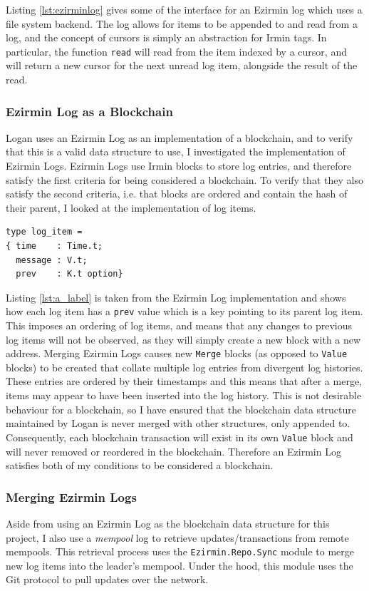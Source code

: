 \documentclass[12pt,a4paper,twoside,openright]{report}
\begin{document}
	Listing \ref{lst:ezirminlog} gives some of the interface for an Ezirmin log which uses a file system backend.
	The log allows for items to be appended to and read from a log, and the concept of cursors is simply an abstraction for Irmin tags.
	In particular, the function \texttt{read} will read from the item indexed by a cursor, and will return a new cursor for the next unread log item, alongside the result of the read.

	\subsubsection*{Ezirmin Log as a Blockchain}
	Logan uses an Ezirmin Log as an implementation of a blockchain, and to verify that this is a valid data structure to use, I investigated the implementation of Ezirmin Logs.
	Ezirmin Logs use Irmin blocks to store log entries, and therefore satisfy the first criteria for being considered a blockchain. 
	To verify that they also satisfy the second criteria, i.e. that blocks are ordered and contain the hash of their parent, I looked at the implementation of log items.

	\begin{lstlisting}[caption={Ezirmin Log Item},label={lst:a_label}]
type log_item =
{ time    : Time.t;
  message : V.t;
  prev    : K.t option}
	\end{lstlisting}

	Listing \ref{lst:a_label} is taken from the Ezirmin Log implementation and shows how each log item has a \texttt{prev} value which is a key pointing to its parent log item. 
	This imposes an ordering of log items, and means that any changes to previous log items will not be observed, as they will simply create a new block with a new address. 
	Merging Ezirmin Logs causes new \texttt{Merge} blocks (as opposed to \texttt{Value} blocks) to be created that collate multiple log entries from divergent log histories.
	These entries are ordered by their timestamps and this means that after a merge, items may appear to have been inserted into the log history.
	This is not desirable behaviour for a blockchain, so I have ensured that the blockchain data structure maintained by Logan is never merged with other structures, only appended to. 
	Consequently, each blockchain transaction will exist in its own \texttt{Value} block and will never removed or reordered in the blockchain.
	Therefore an Ezirmin Log satisfies both of my conditions to be considered a blockchain.

	\subsubsection*{Merging Ezirmin Logs}
	Aside from using an Ezirmin Log as the blockchain data structure for this project, I also use a \textit{mempool} log to retrieve updates/transactions from remote mempools. 
	This retrieval process uses the \texttt{Ezirmin.Repo.Sync} module to merge new log items into the leader's mempool.
	Under the hood, this module uses the Git protocol to pull updates over the network.\\
	
\end{document}
